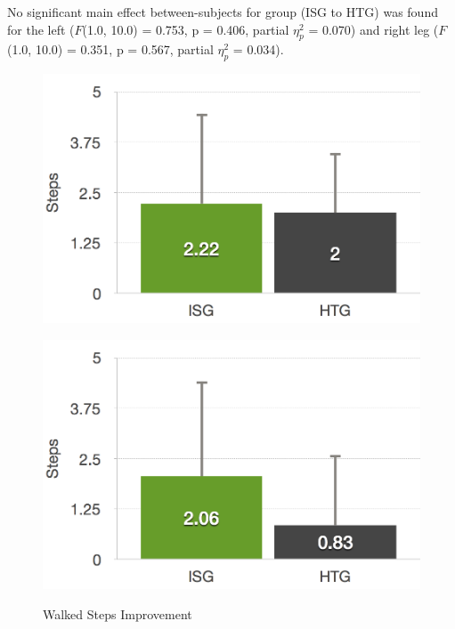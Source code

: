 No significant main effect between-subjects for group (ISG to HTG) was found for the left ($F$(1.0, 10.0) = 0.753, p = 0.406, partial $\eta_{p}^{2}$ = 0.070) and right leg ($F$(1.0, 10.0) = 0.351, p = 0.567, partial $\eta_{p}^{2}$ = 0.034).
\begin{figure}[htb]
	\centering
	\begin{minipage}[t]{0.49\linewidth}
		\centering
		\includegraphics[width=1\linewidth]{Pictures/6_4_DIA_StepsLeftDiff}
		\label{fig:6_4_stepsLeftImprovement}
	\end{minipage}
	\hfill
	\begin{minipage}[t]{0.49\linewidth}
		\centering
		\includegraphics[width=1\linewidth]{Pictures/6_4_DIA_StepsRightDiff}
		\label{fig:6_4_stepsRightImprovement}
	\end{minipage}
	\caption{Walked Steps Improvement}
	\label{fig:6_4_stepsImprovement}
\end{figure}

